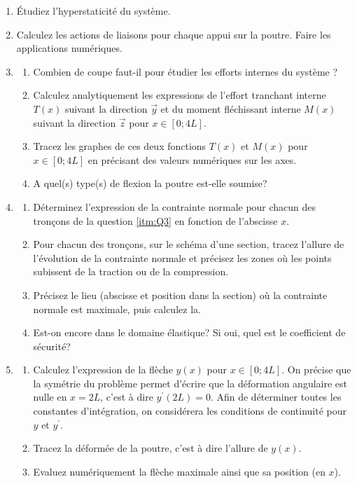 \documentclass[lecture.tex]{subfiles}
\begin{document}
\begin{enumerate}
  \item Étudiez l’hyperstaticité du système.
  \item Calculez les actions de liaisons pour chaque appui sur la poutre. Faire les applications numériques.
  \item \label{itm:Q3}
  \begin{enumerate}
    \item Combien de coupe faut-il pour étudier les efforts internes du système ?
    \item Calculez analytiquement les expressions de l'effort tranchant interne $T(x)$ suivant la direction $\vec{y}$ et du moment fléchissant interne $M(x)$ suivant la direction $\vec{z}$ pour $x \in[0 ; 4L]$.
    \item Tracez les graphes de ces deux fonctions $T(x)$ et $M(x)$ pour $x \in[0 ; 4L]$ en précisant des valeurs numériques sur les axes.
    \item A quel(s) type(s) de flexion la poutre est-elle soumise?
  \end{enumerate}
  \item
  \begin{enumerate}
    \item Déterminez l'expression de la contrainte normale pour chacun des tronçons de la question \ref{itm:Q3} en fonction de l'abscisse $x$.
    \item Pour chacun des tronçons, sur le schéma d'une section, tracez l'allure de l'évolution de la contrainte normale et précisez les zones où les points subissent de la traction ou de la compression.
    \item Précisez le lieu (abscisse et position dans la section) où la contrainte normale est maximale, puis calculez la.
    \item Est-on encore dans le domaine élastique? Si oui, quel est le coefficient de sécurité?
  \end{enumerate}
  \item
  \begin{enumerate}
    \item Calculez l'expression de la flèche $y(x)$ pour $x \in[0 ; 4L]$. On précise que la symétrie du problème permet d'écrire que la déformation angulaire est nulle en $x=2L$, c'est à dire $y^\prime(2L)=0$. Afin de déterminer toutes les constantes d'intégration, on considérera les conditions de continuité pour $y$ et $y^\prime$.
    \item Tracez la déformée de la poutre, c'est à dire l'allure de $y(x)$.
    \item Evaluez numériquement la flèche maximale ainsi que sa position (en $x$).
  \end{enumerate}
\end{enumerate}

\finexercice
\end{document}
